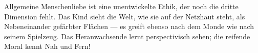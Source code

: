 Allgemeine Menschenliebe ist eine unentwickelte Ethik, der noch die dritte Dimension fehlt. Das Kind sieht die Welt, wie sie auf der Netzhaut steht, als Nebeneinander gefärbter Flächen — es greift ebenso nach dem Monde wie nach seinem Spielzeug. Das Heranwachsende lernt perspectivisch sehen; die reifende Moral kennt Nah und Fern!
\par

